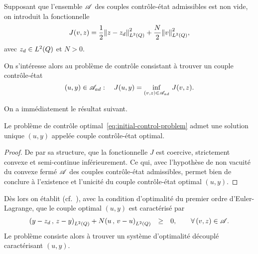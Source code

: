 Supposant que l'ensemble $\mathscr{A}$ des couples contrôle-état admissibles est
non vide, on introduit la fonctionnelle
\begin{equation*}\label{eq:initial-cost-function}
    J(v,z) = \dfrac{1}{2}{\left\|{z - z_{d} }\right\|}_{L^{2}\left({Q}\right)}^{2} + \dfrac{N}{2}{\left\|{v }\right\|}_{L^{2}\left({Q}\right)}^{2},
\end{equation*}
avec $z_{d}\in L^{2}\!\left({Q}\right)$ et $N > 0$.

On s'intéresse alors au problème de contrôle consistant à trouver un couple
contrôle-état
\begin{equation}\label{eq:initial-control-problem}
    (u,y)\in {\mathscr{A}}_{ad}:\quad J(u,y) = \inf_{(v,z)\in
    {\mathscr{A}}_{ad}}\,J(v,z).
\end{equation}

On a immédiatement le résultat suivant.
\begin{theoreme}%
    Le problème de contrôle optimal~\eqref{eq:initial-control-problem}
    admet une solution unique $(u,y)$ appelée couple contrôle-état optimal.
\end{theoreme}

\begin{proof}%
    De par sa structure, que la fonctionnelle $J$ est coercive, strictement
    convexe et semi-continue inférieurement. Ce qui, avec l'hypothèse de
    non vacuité du convexe fermé $\mathscr{A}$ des couples contrôle-état
    admissibles, permet bien de conclure à l'existence et l'unicité du
    couple contrôle-état optimal $(u,y)$.
\end{proof}

Dès lors on établit (cf.~\cite{lions2}), avec la condition d'optimalité du
premier ordre d'Euler-Lagrange, que le couple optimal $(u,y)$ est
caractérisé par
\begin{equation*}\label{eq:initial-variational-inequation}
    \begin{array}{rcl}
        \scalaireq{%
            y - z_{d}
        }{%
            z - y
        } + N\scalaireq{u}{v - u} & \geq & 0,\qquad \forall\,(v,z)\in\Ascr.
    \end{array}
\end{equation*}
Le problème consiste alors à trouver un système d'optimalité découplé
caractérisant $(u,y)$.

